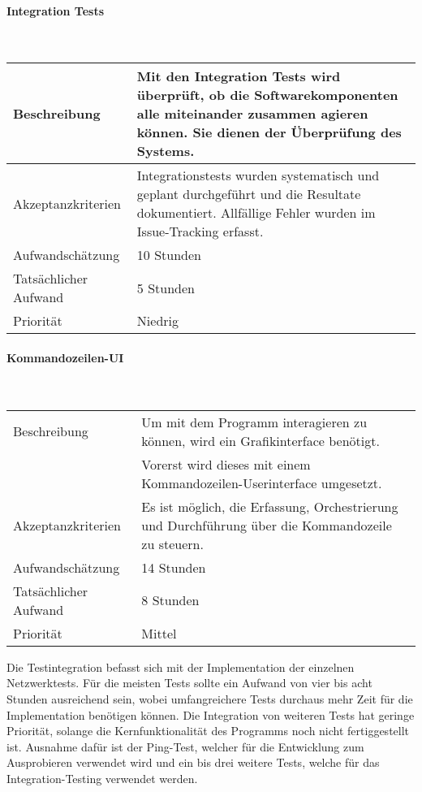 \documentclass[]{subfiles}
\begin{document}
        \paragraph*{Integration Tests}\mbox{} \\
        \begin{tabularx}{\textwidth}{lX}
            \toprule
            Beschreibung & Mit den Integration Tests wird überprüft, ob die Softwarekomponenten alle miteinander zusammen agieren können. Sie dienen der Überprüfung des Systems.\\
            \midrule
            Akzeptanzkriterien & Integrationstests wurden systematisch und geplant durchgeführt und die Resultate dokumentiert. Allfällige Fehler wurden im Issue-Tracking erfasst.\\
            \midrule
            Aufwandschätzung & 10 Stunden\\
            Tatsächlicher Aufwand & 5 Stunden\\ 
            \midrule
            Priorität & Niedrig\\
            \bottomrule
        \end{tabularx}
        
        \paragraph*{Kommandozeilen-UI}\mbox{} \\
        \begin{tabularx}{\textwidth}{lX}
            \toprule
            Beschreibung & Um mit dem Programm interagieren zu können, wird ein Grafikinterface benötigt.\\
             & Vorerst wird dieses mit einem Kommandozeilen-Userinterface umgesetzt.\\
            \midrule
            Akzeptanzkriterien & Es ist möglich, die Erfassung, Orchestrierung und Durchführung über die Kommandozeile zu steuern.\\
            \midrule
            Aufwandschätzung & 14 Stunden\\
            Tatsächlicher Aufwand & 8 Stunden\\ 
            \midrule
            Priorität & Mittel \\
            \bottomrule
        \end{tabularx}
        \newpage
    
        
    
        Die Testintegration befasst sich mit der Implementation der einzelnen Netzwerktests. 
        Für die meisten Tests sollte ein Aufwand von vier bis acht Stunden ausreichend sein, wobei umfangreichere Tests durchaus mehr Zeit für die Implementation benötigen können.
        Die Integration von weiteren Tests hat geringe Priorität, solange die Kernfunktionalität des Programms noch nicht fertiggestellt ist. 
        Ausnahme dafür ist der Ping-Test, welcher für die Entwicklung zum Ausprobieren verwendet wird und ein bis drei weitere Tests, welche für das Integration-Testing verwendet werden.
    
\end{document}
